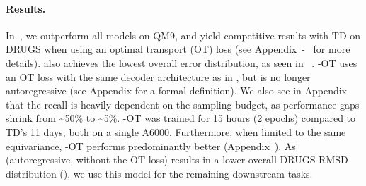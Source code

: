 \paragraph{Results.}
In~, we outperform all models on QM9, and yield competitive results with TD on DRUGS when using an optimal transport (OT) loss (see Appendix~-~ for more details). \model also achieves the lowest overall error distribution, as seen in ~.
\modelns-OT uses an OT loss with the same decoder architecture as in , but is no longer autoregressive (see Appendix  for a formal definition).
We also see in Appendix ~ that the recall is heavily dependent on the sampling budget, as performance gaps shrink from \textasciitilde{50\%} to \textasciitilde{5\%}. 
\modelns-OT was trained for 15 hours (2 epochs) compared to TD's 11 days, both on a single A6000. Furthermore, when limited to the same equivariance, \modelns-OT performs predominantly better (Appendix~). 
As \model (autoregressive, without the OT loss) results in a lower overall DRUGS RMSD distribution (), we use this model for the remaining downstream tasks.

